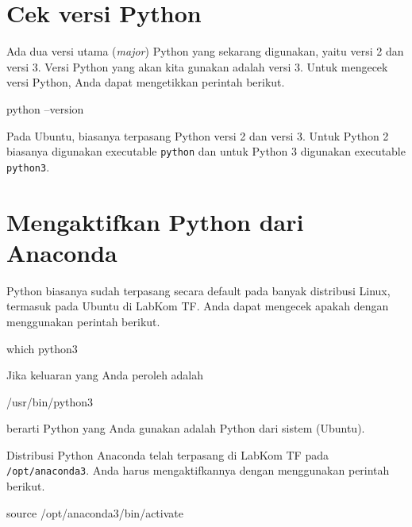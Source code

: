 \documentclass[a4paper,11pt]{extarticle}
\begin{document}
\section{Cek versi Python}

Ada dua versi utama (\textit{major}) Python yang sekarang digunakan, yaitu
versi 2 dan versi 3.
Versi Python yang akan kita gunakan adalah versi 3. Untuk mengecek versi Python,
Anda dapat mengetikkan perintah berikut.
\begin{textcode}
python --version
\end{textcode}
Pada Ubuntu, biasanya terpasang Python versi 2 dan versi 3. Untuk Python 2 biasanya
digunakan executable \texttt{python} dan untuk Python 3 digunakan
executable \texttt{python3}.


\section{Mengaktifkan Python dari Anaconda}

Python biasanya sudah terpasang secara default pada banyak distribusi Linux, termasuk
pada Ubuntu di LabKom TF. Anda dapat mengecek apakah dengan menggunakan perintah
berikut.
\begin{textcode}
which python3
\end{textcode}
Jika keluaran yang Anda peroleh adalah
\begin{textcode}
/usr/bin/python3
\end{textcode}
berarti Python yang Anda gunakan adalah Python dari sistem (Ubuntu).

Distribusi Python Anaconda telah terpasang di LabKom TF pada \texttt{/opt/anaconda3}.
Anda harus mengaktifkannya dengan menggunakan perintah berikut.
\begin{textcode}
source /opt/anaconda3/bin/activate
\end{textcode}















\end{document}
